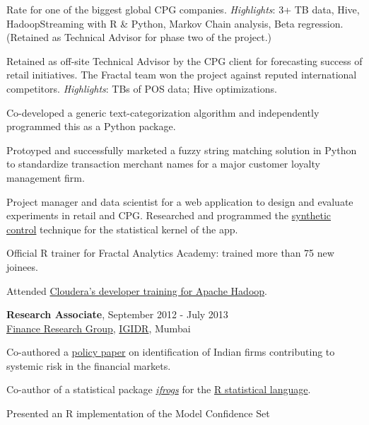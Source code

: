 \documentclass[a4paper,11pt]{article}
\renewenvironment{itemize}{
\begin{list}{}{
  \setlength{\leftmargin}{1.5em}
  }
  }{
\end{list}
}
\begin{document}
{\begin{itemize}
\begin{itemize}
        Rate for one of the biggest global CPG companies. \emph{Highlights}: 3+
        TB data, Hive, HadoopStreaming with R \& Python, Markov Chain analysis,
        Beta regression. (Retained as Technical Advisor for phase two of the
        project.)
      \item Retained as off-site Technical Advisor by the CPG client for
        forecasting success of retail initiatives. The Fractal team won the
        project against reputed international competitors. \emph{Highlights}:
        TBs of POS data; Hive optimizations.
      \item Co-developed a generic text-categorization algorithm and
        independently programmed this as a Python package.
      \item Protoyped and successfully marketed a fuzzy string matching
        solution in Python to standardize transaction merchant names for a
        major customer loyalty management firm.
      \item Project manager and data scientist for a web application to design
        and evaluate experiments in retail and CPG. Researched and programmed
        the \href{www.hks.harvard.edu/fs/aabadie/ccsp.pdf}{synthetic control}
        technique for the statistical kernel of the app.
      \item Official R trainer for Fractal Analytics Academy: trained more than
        75 new joinees.
      \item Attended \href{http://university.cloudera.com/course/developer}
        {Cloudera's developer training for Apache Hadoop}.
    \end{itemize}
    \vspace*{\baselineskip} %
  \item \textbf{Research Associate}, September 2012 - July 2013 \\
    \href{http://ifrogs.org}{Finance Research Group},
    \href{http://www.igidr.ac.in}{IGIDR}, Mumbai
    \begin{itemize}
      \item Co-authored a
        \href{http://ifrogs.org/releases/Thomasetal2013_systemicRisk.html}{policy
        paper} on identification of Indian firms contributing to systemic risk
        in the financial markets.
      \item Co-author of a statistical package
        \href{https://r-forge.r-project.org/projects/ifrogs/}{\emph{ifrogs}}
        for the \href{http://www.r-project.org}{R statistical language}.
      \item Presented an R implementation of the Model Confidence Set

\end{itemize}
\end{itemize}}
\end{document}
